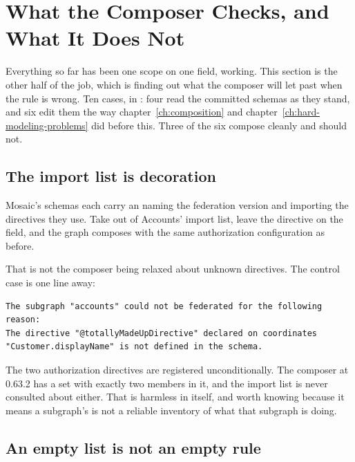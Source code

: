 \section{What the Composer Checks, and What It Does Not}
\label{sec:ch15-what-the-composer-checks}
%

Everything so far has been one scope on one field, working. This section is the
other half of the job, which is finding out what the composer will let past
when the rule is wrong. Ten cases, in : four read
the committed schemas as they stand, and six edit them the way
chapter~\ref{ch:composition} and chapter~\ref{ch:hard-modeling-problems} did
before this. Three of the six compose cleanly and should not.

\subsection*{The import list is decoration}

%
Mosaic's schemas each carry an  naming the federation version and
importing the directives they use. Take  out of
Accounts' import list, leave the directive on the field, and the graph composes
with the same authorization configuration as before.

That is not the composer being relaxed about unknown directives. The control
case is one line away:

\begin{verbatim}
The subgraph "accounts" could not be federated for the following reason:
The directive "@totallyMadeUpDirective" declared on coordinates
"Customer.displayName" is not defined in the schema.
\end{verbatim}

The two authorization directives are registered unconditionally. The composer
at 0.63.2 has a set with exactly two members in it, and the import list is
never consulted about either. That is harmless in itself, and worth knowing
because it means a subgraph's  is not a reliable inventory of what
that subgraph is doing.

\subsection*{An empty list is not an empty rule}

